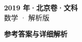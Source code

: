 \documentclass[zihao=-4, a4paper]{ctexart}
\begin{document}
\begin{center}
  {\Large\bfseries 2019 年·北京卷·文科}\\[4pt]
  {\large 数学 · 解析版}
\end{center}
\medskip
{}

\clearpage
{}
\begin{center}{\Large\bfseries 参考答案与详细解析}\end{center}
\medskip

\end{document}
